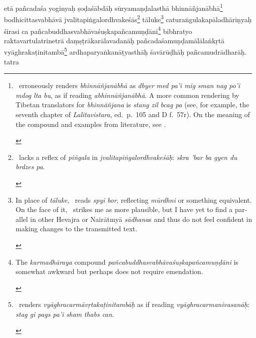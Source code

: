 \documentclass[naipra.tex]{subfiles}
\begin{document}
\begin{sanskrit}

\pstart
etā pañcadaśa yoginyaḥ ṣoḍaśābdāḥ sūryamaṇḍalasthā bhinnāñjanābhā\footnote{
	\begin{english}%
		\TIB\ erroneously renders \emph{bhinnāñjanābhā} as \emph{dbyer med pa'i mig sman nag po'i mdog lta bu}, as if reading \emph{abhinnāñjanābhā}.
		A more common rendering by Tibetan translators for \emph{bhinnāñjana} is \emph{stang zil bcag pa} (see, for example, the seventh chapter of \emph{Lalitavistara}, ed.\ p.\ 105 and D f.\ 57r).
		On the meaning of the compound and examples from literature, see \cite{vogel1968}.
	\end{english}
} bodhicittasvabhāvā jvalitapiṅgalordhvakeśās\footnote{
	\begin{english}%
		\TIB\ lacks a reflex of \emph{piṅgala} in \emph{jvalitapiṅgalordhvakeśāḥ}: \emph{skra 'bar ba gyen du brdzes pa}.
	\end{english}
} \crux tāluke\crux\footnote{
	\begin{english}%
		In place of \emph{tāluke}, \TIB\ reads \emph{spyi bor}, reflecting \emph{mūrdhni} or something equivalent.
		On the face of it, \TIB\ strikes me as more plausible, but I have yet to find a parallel in other Hevajra or Nairātmyā \emph{sādhana}s and thus do not feel confident in making changes to the transmitted text. 
	\end{english}
} caturaṅgulakapāladhāriṇyaḥ śirasi ca pañcabuddhasvabhāvaśuṣkapañcamuṇḍāni\footnote{
	\begin{english}%
		The \emph{karmadhāraya} compound \emph{pañcabuddhasvabhāvaśuṣkapañcamuṇḍāni} is somewhat awkward but perhaps does not require emendation.
	\end{english}
} bibhratyo raktavartulatrinetrā daṃṣṭrākarālavadanāḥ pañcadaśamuṇḍamālālaṅkṛtā vyāghrakaṭinitambā\footnote{
	\begin{english}%
		\TIB\ renders \emph{vyāghracarmāvṛtakaṭinitambāḥ} as if reading \emph{vyāghracarmanivasanāḥ}: \emph{stag gi pags pa'i sham thabs can}.
	\end{english}
} ardhaparyaṅkanāṭyasthāḥ śavārūḍhāḥ pañcamudrādharāḥ. tatra\Emdash
\pend


\end{sanskrit}
\end{document}
